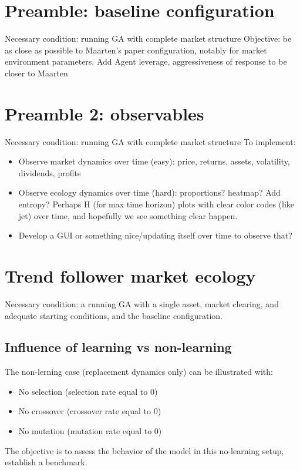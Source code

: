 \documentclass{article}
\begin{document}
\section{Preamble: baseline configuration}

Necessary condition: running GA with complete market structure
Objective: be as close as possible to Maarten's paper configuration, notably for market environment parameters.
Add Agent leverage, aggressiveness of response to be closer to Maarten
\section{Preamble 2: observables}

Necessary condition: running GA with complete market structure
To implement:
\begin{itemize}
    \item Observe market dynamics over time (easy): price, returns, assets, volatility, dividends, profits
    \item Observe ecology dynamics over time (hard): proportions? heatmap? Add entropy?
    Perhaps H (for max time horizon) plots with clear color codes (like jet) over time, and hopefully we see something clear happen.
    \item Develop a GUI or something nice/updating itself over time to observe that?
\end{itemize}

\section{Trend follower market ecology}

Necessary condition: a running GA with a single asset, market clearing, and adequate starting conditions, and the baseline configuration.

\subsection{Influence of learning vs non-learning}
The non-lerning case (replacement dynamics only) can be illustrated with:
\begin{itemize}
    \item No selection (selection rate equal to 0)
    \item No crossover (crossover rate equal to 0)
    \item No mutation (mutation rate equal to 0)
\end{itemize}
The objective is to assess the behavior of the model in this no-learning setup, establish a benchmark.
\end{document}
